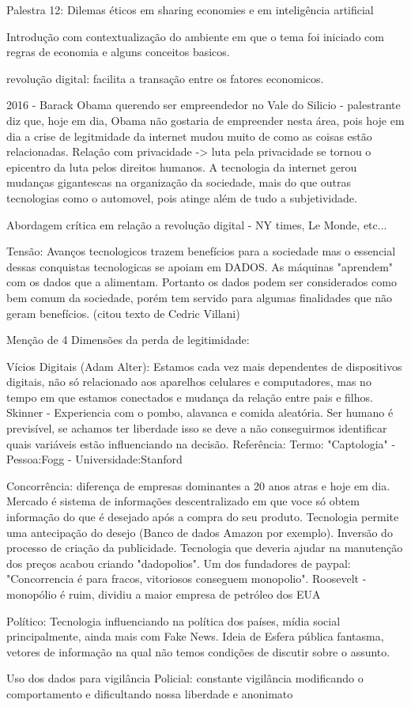 Palestra 12: Dilemas éticos em sharing economies e em inteligência artificial

Introdução com contextualização do ambiente em que o tema foi iniciado com
regras de economia e alguns conceitos basicos.

revolução digital: facilita a transação entre os fatores economicos.

2016 - Barack Obama querendo ser empreendedor no Vale do Silicio - palestrante
diz que, hoje em dia, Obama não gostaria de empreender nesta área, pois
hoje em dia a crise de legitmidade da internet mudou muito de como as
coisas estão relacionadas. Relação com privacidade -> luta pela privacidade se 
tornou o epicentro da luta pelos direitos humanos.
A tecnologia da internet gerou mudanças gigantescas na organização da 
sociedade, mais do que outras tecnologias como o automovel, pois atinge
além de tudo a  subjetividade.

Abordagem crítica em relação a revolução digital - NY times, Le Monde, etc...

Tensão: Avanços tecnologicos trazem benefícios para a sociedade mas o
essencial dessas conquistas tecnologicas se apoiam em DADOS. As máquinas
"aprendem" com os dados que a alimentam. Portanto os dados podem ser 
considerados como bem comum da sociedade, porém tem servido para algumas
finalidades que não geram benefícios. (citou texto de Cedric Villani)

Menção de 4 Dimensões da perda de legitimidade:

    Vícios Digitais (Adam Alter): Estamos cada vez mais dependentes de 
    dispositivos digitais, não só relacionado aos aparelhos celulares e
    computadores, mas no tempo em que estamos conectados e mudança da relação
    entre pais e filhos.
    Skinner - Experiencia com o pombo, alavanca e comida aleatória.
    Ser humano é previsível, se achamos ter liberdade isso se deve a não
    conseguirmos identificar quais variáveis estão influenciando
    na decisão.
    Referência: Termo: "Captologia" - Pessoa:Fogg - Universidade:Stanford

    Concorrência: diferença de empresas dominantes a 20 anos atras e hoje
    em dia. Mercado é sistema de informações descentralizado em que voce
    só obtem informação do que é desejado após a compra do seu produto.
    Tecnologia permite uma antecipação do desejo (Banco de dados Amazon por
    exemplo). Inversão do processo de criação da publicidade. Tecnologia que
    deveria ajudar na manutenção dos preços acabou criando "dadopolios".
    Um dos fundadores de paypal: "Concorrencia é para fracos, vitoriosos 
    conseguem monopolio".
    Roosevelt - monopólio é ruim, dividiu a maior empresa de petróleo dos EUA

    Político: Tecnologia influenciando na política dos países, mídia
    social principalmente, ainda mais com Fake News. Ideia de Esfera
    pública fantasma, vetores de informação na qual não temos condições
    de discutir sobre o assunto.

    Uso dos dados para vigilância Policial: constante vigilância modificando
    o comportamento e dificultando nossa liberdade e anonimato

     